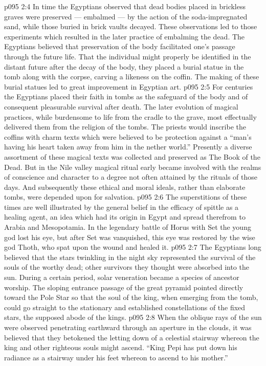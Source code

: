 \vs p095 2:4 \pc In time the Egyptians observed that dead bodies placed in brickless graves were preserved --- embalmed --- by the action of the soda\hyp{}impregnated sand, while those buried in brick vaults decayed. These observations led to those experiments which resulted in the later practice of embalming the dead. The Egyptians believed that preservation of the body facilitated one’s passage through the future life. That the individual might properly be identified in the distant future after the decay of the body, they placed a burial statue in the tomb along with the corpse, carving a likeness on the coffin. The making of these burial statues led to great improvement in Egyptian art.
\vs p095 2:5 For centuries the Egyptians placed their faith in tombs as the safeguard of the body and of consequent pleasurable survival after death. The later evolution of magical practices, while burdensome to life from the cradle to the grave, most effectually delivered them from the religion of the tombs. The priests would inscribe the coffins with charm texts which were believed to be protection against a “man’s having his heart taken away from him in the nether world.” Presently a diverse assortment of these magical texts was collected and preserved as The Book of the Dead. But in the Nile valley magical ritual early became involved with the realms of conscience and character to a degree not often attained by the rituals of those days. And subsequently these ethical and moral ideals, rather than elaborate tombs, were depended upon for salvation.
\vs p095 2:6 \pc The superstitions of these times are well illustrated by the general belief in the efficacy of spittle as a healing agent, an idea which had its origin in Egypt and spread therefrom to Arabia and Mesopotamia. In the legendary battle of Horus with Set the young god lost his eye, but after Set was vanquished, this eye was restored by the wise god Thoth, who spat upon the wound and healed it.
\vs p095 2:7 \pc The Egyptians long believed that the stars twinkling in the night sky represented the survival of the souls of the worthy dead; other survivors they thought were absorbed into the sun. During a certain period, solar veneration became a species of ancestor worship. The sloping entrance passage of the great pyramid pointed directly toward the Pole Star so that the soul of the king, when emerging from the tomb, could go straight to the stationary and established constellations of the fixed stars, the supposed abode of the kings.
\vs p095 2:8 When the oblique rays of the sun were observed penetrating earthward through an aperture in the clouds, it was believed that they betokened the letting down of a celestial stairway whereon the king and other righteous souls might ascend. “King Pepi has put down his radiance as a stairway under his feet whereon to ascend to his mother.”
